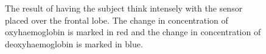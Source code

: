 \begin{figure}[htp]
\centering
{}
\caption[Frontal Lobe Measurements while Thinking Intensely]{The result of having the subject think intensely with the sensor placed over the frontal lobe. The change in concentration of oxyhaemoglobin is marked in red and the change in concentration of deoxyhaemoglobin is marked in blue.}
\end{figure}

